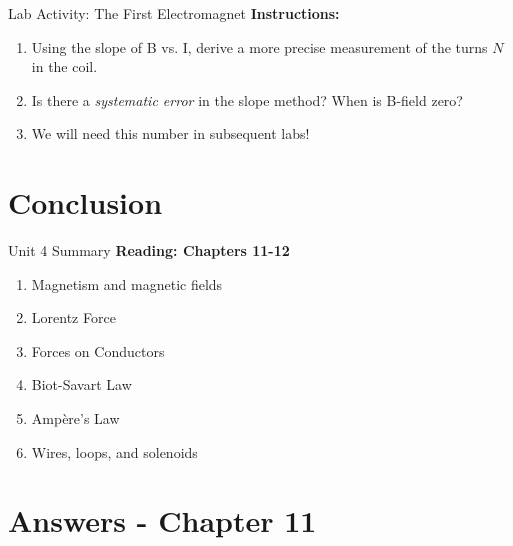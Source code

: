 \documentclass{beamer}
\begin{document}
\begin{frame}{Lab Activity: The First Electromagnet}
\textbf{Instructions:}
\begin{enumerate}
\item Using the slope of B vs. I, derive a more precise measurement of the turns $N$ in the coil.
\item Is there a \textit{systematic error} in the slope method?  When is B-field zero?
\item We will need this number in subsequent labs!
\end{enumerate}
\end{frame}

\section{Conclusion}

\begin{frame}{Unit 4 Summary}
\textbf{Reading: Chapters 11-12}
\begin{enumerate}
\item Magnetism and magnetic fields
\item Lorentz Force
\item Forces on Conductors
\item Biot-Savart Law
\item Amp\`{e}re's Law
\item Wires, loops, and solenoids
\end{enumerate}
\end{frame}

\section{Answers - Chapter 11}
\end{document}
